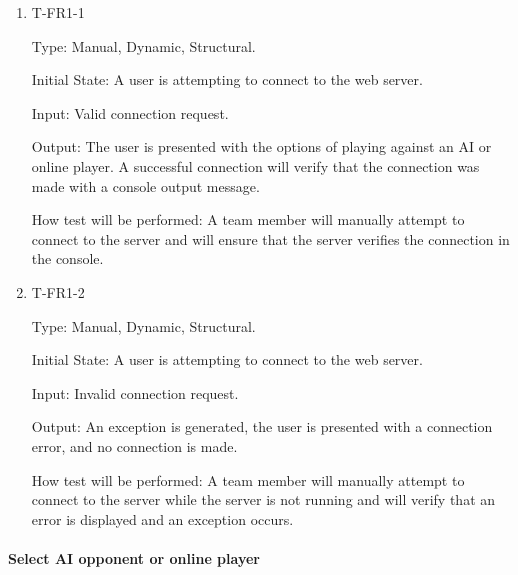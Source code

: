 \documentclass[12pt, titlepage]{article}
\begin{document}
        \begin{enumerate}
        
        \item{T-FR1-1\\}
        
            Type: Manual, Dynamic, Structural.
            					
            Initial State: A user is attempting to connect to the web server.
            					
            Input: Valid connection request.
            					
            Output: The user is presented with the options of playing against an AI or online player. A successful connection will verify that the connection was made with a console output message.
            					
            How test will be performed: A team member will manually attempt to connect to the server and will ensure that the server verifies the connection in the console.
        
        \item{T-FR1-2\\}
        
            Type: Manual, Dynamic, Structural.
            					
            Initial State: A user is attempting to connect to the web server.
            					
            Input: Invalid connection request.
            					
            Output: An exception is generated, the user is presented with a connection error, and no connection is made.
            					
            How test will be performed: A team member will manually attempt to connect to the server while the server is not running and will verify that an error is displayed and an exception occurs.
        
        \end{enumerate}
    
    \paragraph{Select AI opponent or online player}
        
\end{document}
